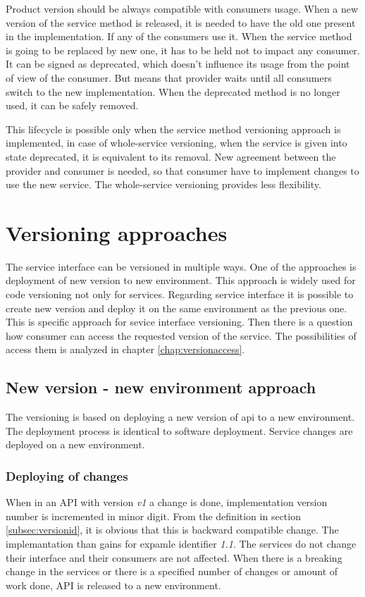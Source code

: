 Product version should be always compatible with consumers usage. When a new version of the service method is released, it is needed to have the old one present in the implementation. If any of the consumers use it. When the service method is going to be replaced by new one, it has to be held not to impact any consumer. It can be signed as deprecated, which doesn't influence its usage from the point of view of the consumer. But means that provider waits until all consumers switch to the new implementation. When the deprecated method is no longer used, it can be safely removed. 

This lifecycle is possible only when the service method versioning approach is implemented, in case of whole-service versioning, when the service is given into state deprecated, it is equivalent to its removal. New agreement between the provider and consumer is needed, so that consumer have to implement changes to use the new service. %
The whole-service versioning provides less flexibility.


\section{Versioning approaches}
\label{sec:versioning-approaches}

The service interface can be versioned in multiple ways. One of the approaches is deployment of new version to new environment. This approach is widely used for code versioning not only for services. Regarding service interface it is possible to create new version and deploy it on the same environment as the previous one. This is specific approach for sevice interface versioning. Then there is a question how consumer can access the requested version of the service. The possibilities of access them is analyzed in chapter \ref{chap:versionaccess}.


\subsection{New version - new environment approach}

The versioning is based on deploying a new version of \gls{api} to a new environment. The deployment process is identical to software deployment. Service changes are deployed on a new environment. %

\subsubsection{Deploying of changes}
When in an API with version \emph{v1} a change is done, implementation version number is incremented in minor digit. From the definition in section \ref{subsec:versionid}, it is obvious that this is backward compatible change. The implemantation than gains for expamle identifier \emph{1.1}. The services do not change their interface and their consumers are not affected. 
When there is a breaking change in the services or there is a specified number of changes or amount of work done, API is released to a new environment. 

